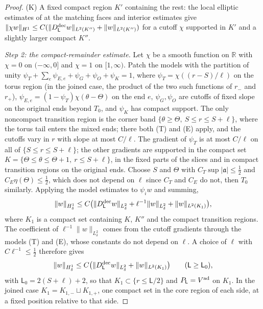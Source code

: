 \documentclass[11pt]{amsart}
\theoremstyle{definition}
\theoremstyle{remark}
\theoremstyle{plain}
\numberwithin{equation}{section}
\newcommand{\RR}{\mathbb{R}}
\begin{document}
\begin{proof}
(K) A fixed compact region $K'$ containing the rest: the local elliptic estimates
of \cite[Theorem~4.17 and Remark~4.19]{DFL} at the matching faces and interior
estimates give $\|\chi w\|_{H^1}\le C(\|D^{\rm dec}_{\mathsf L}w\|_{L^2(K'')}+\|w\|_{L^2(K'')})$ for a
cutoff $\chi$ supported in $K'$ and a slightly larger compact $K''$.

\emph{Step 2: the compact-remainder estimate.} Let $\chi$ be a smooth function on $\RR$
with $\chi=0$ on $(-\infty,0]$ and $\chi=1$ on $[1,\infty)$. Patch the models with the partition
of unity $\psi_T+\sum_e\psi_{E,e}+\psi_G+\psi_O+\psi_K=1$, where $\psi_T=\chi((r-S)/\ell)$ on the
torus region (in the joined case, the product of the two such functions of $r_-$ and $r_+$),
$\psi_{E,e}=(1-\psi_T)\chi(\theta-\Theta)$ on the end $e$, $\psi_G,\psi_O$ are cutoffs of fixed
slope on the original ends beyond $T_0$, and $\psi_K$ has compact support. The only noncompact
transition region is the corner band $\{\theta\ge\Theta,\ S\le r\le S+\ell\}$, where the torus
tail enters the mixed ends; there both (T) and (E) apply, and the cutoffs vary in $r$ with slope
at most $C/\ell$. The gradient of $\psi_T$ is at most $C/\ell$ on all of $\{S\le r\le S+\ell\}$;
the other gradients are supported in the compact set
$K=\{\Theta\le\theta\le\Theta+1,\ r\le S+\ell\}$, in the fixed parts of the slices and in
compact transition regions on the original ends. Choose $S$ and $\Theta$ with
$C_T\sup|\mathfrak a|\le\tfrac12$ and $C_E\eta(\Theta)\le\tfrac12$, which does not depend on
$\ell$ since $C_T$ and $C_E$ do not, then $T_0$ similarly. Applying the model estimates to
$\psi_iw$ and summing,
\[
\|w\|_{H^1_\delta}\le C\bigl(\|D^{\rm dec}_{\mathsf L}w\|_{L^2_\delta}
+\ell^{-1}\|w\|_{L^2_\delta}+\|w\|_{L^2(K_1)}\bigr),
\]
where $K_1$ is a compact set containing $K$, $K''$ and the compact transition regions. The
coefficient of $\ell^{-1}\|w\|_{L^2_\delta}$ comes from the cutoff gradients through the
models (T) and (E), whose constants do not depend on $\ell$. A choice of $\ell$ with
$C\ell^{-1}\le\tfrac12$ therefore gives
\begin{equation}\label{eq:torus-remainder}
\|w\|_{H^1_\delta}\le C\bigl(\|D^{\rm dec}_{\mathsf L}w\|_{L^2_\delta}+\|w\|_{L^2(K_1)}\bigr)\qquad(\mathsf L\ge \mathsf L_0),
\end{equation}
with $\mathsf L_0=2(S+\ell)+2$, so that $K_1\subset\{r\le \mathsf L/2\}$ and $P_\mathsf L=V^{\rm ad}$ on $K_1$. In the
joined case $K_1=K_{1,-}\sqcup K_{1,+}$, one compact set in the core region of each side,
at a fixed position relative to that side.


\end{proof}
\end{document}
